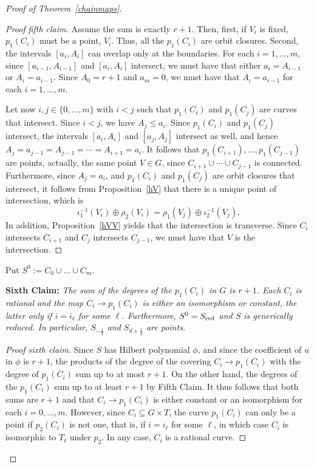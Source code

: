 \documentclass[10pt,a4paper]{amsart}
\def\red{\text{\rm red}}
\begin{document}
\begin{proof}[Proof of Theorem~\ref{chainmaps}]
\begin{proof}[Proof fifth claim]
Assume the sum is exactly $r+1$. Then, first, if $V_i$ is fixed, $p_1(C_i)$ must be a point, $V_i$. Thus, all the $p_1(C_i)$ are orbit closures. Second, the intervals $[a_i,A_i]$ can overlap only at the boundaries. For each $i=1,\dots,m$, since $[a_{i-1},A_{i-1}]$ and $[a_i,A_i]$ intersect, we must have that either 
$a_i=A_{i-1}$ or $A_i=a_{i-1}$. Since $A_0=r+1$ and $a_m=0$, we must have that $A_i=a_{i-1}$ for each $i=1,\dots,m$. 

Let now $i,j\in\{0,\dots,m\}$ with $i<j$ such that $p_1(C_i)$ and $p_1(C_j)$ are curves that intersect. Since $i<j$, we have $A_j\leq a_i$. Since $p_1(C_i)$ and $p_1(C_j)$ intersect, the intervals $[a_i,A_i]$ and $[a_j,A_j]$ intersect as well, and hence $A_j=a_{j-1}=A_{j-1}=\cdots=A_{i+1}=a_i$. It follows that 
$p_1(C_{i+1}),\dots,p_1(C_{j-1})$ are points, actually, the same point $V\in G$, since $C_{i+1}\cup\cdots\cup C_{j-1}$ is connected.  Furthermore, since $A_j=a_i$, and $p_1(C_i)$ and $p_1(C_j)$ are orbit closures that intersect, it follows from Proposition~\ref{hV} that 
there is a unique point of intersection, which is
\[
\iota_1^{-1}(V_i)\oplus\rho_2(V_i)=\rho_1(V_j)\oplus\iota_2^{-1}(V_j).
\]
In addition, Proposition~\ref{hVV} yields that the intersection is transverse. Since 
$C_i$ intersects $C_{i+1}$ and $C_j$ intersects $C_{j-1}$, we must have that $V$ is the intersection.
\end{proof}

Put $S^0:=C_0\cup\dots\cup C_m$. 

\vskip0.2cm

{\bf Sixth Claim:} {\it The sum of the degrees of the $p_1(C_i)$ in $G$ is $r+1$. Each $C_i$ is rational and the map $C_i\to p_1(C_i)$ is either an isomorphism or constant, the latter only if $i=i_\ell$ for some $\ell$. Furthermore, $S^0=S_\red$ and $S$ is generically reduced. In particular, $S_{-\frac{1}{2}}$ and $S_{d+\frac{1}{2}}$ are points.}

\begin{proof}[Proof sixth claim] Since $S$ has Hilbert polynomial $\phi$, and since the coefficient of $u$ in $\phi$ is $r+1$, the products of the degree of the covering $C_i\to p_1(C_i)$ with the degree of $p_1(C_i)$ sum up to at most $r+1$. On the other hand, the degrees of the $p_1(C_i)$ sum up to at least $r+1$ by Fifth Claim. It thus follows that both sums are $r+1$ and that $C_i\to p_1(C_i)$ is either constant or an isomorphism for each $i=0,\dots,m$. However, since $C_i\subseteq G\times T$, the curve $p_1(C_i)$ can only be a point if $p_2(C_i)$ is not one, that is, if $i=i_\ell$ for some $\ell$, in which case $C_i$ is isomorphic to $T_\ell$ under $p_2$. In any case, $C_i$ is a rational curve. 


\end{proof}
\end{proof}
\end{document}
